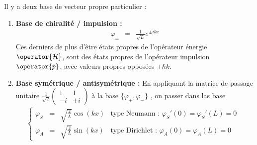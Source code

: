 \medskip
Il y a deux base de vecteur propre particulier : 
\begin{enumerate}[label=\roman*)]
	\item {\bf Base de chiralité / impulsion :}
	\begin{eqnarray}\label{chap.1.rapel.libre.7}
		\varphi_\pm  & = & \displaystyle \frac{1}{\sqrt{L}} e^{\pm ikx} 
	\end{eqnarray}
	Ces derniers de plus d'être états propres de l’opérateur énergie $\operator{\mathcal{H}}$, sont des états propres de l’opérateur impulsion $\operator{p}$, avec valeurs propres opposées $\pm \hbar k$.
	\item {\bf Base symétrique / antisymétrique :} En appliquant la matrice de passage unitaire  $\frac{1}{\sqrt{2}}\left (\begin{matrix}1 & 1 \\ -i & + i\end{matrix}\right)$ à la base $\{ \varphi_+ , \varphi_- \}$ , on passer dans las base    
	\begin{eqnarray}\label{chap.1.rapel.libre.8}
		\left \{ \begin{array}{rcllll} \varphi_S  & = & \displaystyle \sqrt{\frac{2}{L}} \cos (kx)  & \mbox{type Neumann  : $\varphi_S'(0) = \varphi_S'(L) = 0 $ } \\ \varphi_A   & = & \displaystyle \sqrt{\frac{2}{L}} \sin (kx)  & \mbox{type Dirichlet : $\varphi_A(0) = \varphi_A(L) = 0 $}\end{array} \right.
	\end{eqnarray}
\end{enumerate}


